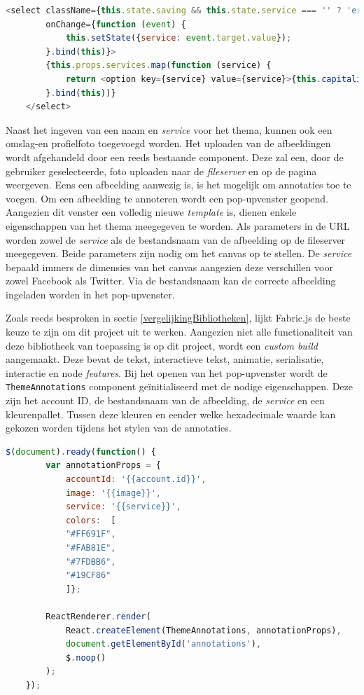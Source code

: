 \begin{lstlisting}[caption={Theme component - Dropdown},label=lst:ThemeComponentDropdown,language=javascript]
	<select className={this.state.saving && this.state.service === '' ? 'error 		fieldset-input' : 'fieldset-input'} id="service" name="service" ref="service" value={this.getService()}
		onChange={function (event) {
			this.setState({service: event.target.value});
		}.bind(this)}>
		{this.props.services.map(function (service) {
			return <option key={service} value={service}>{this.capitalize(service)}</option>
		}.bind(this))}
	</select>
\end{lstlisting}

Naast het ingeven van een naam en \textit{service} voor het thema, kunnen ook een omslag-en profielfoto toegevoegd worden. Het uploaden van de afbeeldingen wordt afgehandeld door een reeds bestaande component. Deze zal een, door de gebruiker geselecteerde, foto uploaden naar de \textit{fileserver} en op de pagina weergeven. Eens een afbeelding aanwezig is, is het mogelijk om annotaties toe te voegen. Om een afbeelding te annoteren wordt een pop-upvenster geopend. Aangezien dit venster een volledig nieuwe \textit{template} is, dienen enkele eigenschappen van het thema meegegeven te worden. Als parameters in de URL worden zowel de \textit{service} als de bestandsnaam van de afbeelding op de fileserver meegegeven. Beide parameters zijn nodig om het canvas op te stellen. De \textit{service} bepaald immers de dimensies van het canvas aangezien deze verschillen voor zowel Facebook als Twitter. Via de bestandsnaam kan de correcte afbeelding ingeladen worden in het pop-upvenster.

Zoals reeds besproken in sectie \ref{vergelijkingBibliotheken}, lijkt Fabric.js de beste keuze te zijn om dit project uit te werken. Aangezien niet alle functionaliteit van deze bibliotheek van toepassing is op dit project, wordt een \textit{custom build} aangemaakt. Deze bevat de tekst, interactieve tekst, animatie, serialisatie, interactie en node \textit{features}. Bij het openen van het pop-upvenster wordt de \texttt{ThemeAnnotations} component ge\"{i}nitialiseerd met de nodige eigenschappen. Deze zijn het account ID, de bestandsnaam van de afbeelding, de \textit{service} en een kleurenpallet. Tussen deze kleuren en eender welke hexadecimale waarde kan gekozen worden tijdens het stylen van de annotaties.

\begin{lstlisting}[caption={ThemeAnnotations component - initialisatie}, label={ThemeAnnotationsInitialisation},language=javascript]
	$(document).ready(function() {
		var annotationProps = {
			accountId: '{{account.id}}',
			image: '{{image}}',
			service: '{{service}}',
			colors:  [
			"#FF691F",
			"#FAB81E",
			"#7FDBB6",
			"#19CF86"
			]};
			
		ReactRenderer.render(
			React.createElement(ThemeAnnotations, annotationProps),
			document.getElementById('annotations'),
			$.noop()
		);
	});
\end{lstlisting}

